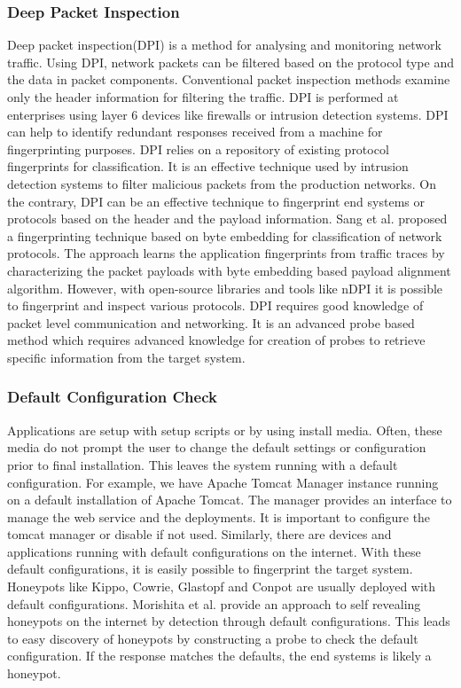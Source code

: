 \documentclass[letterpaper, 10 pt, conference]{ieeeconf}  %
\begin{document}
\subsubsection{Deep Packet Inspection}
Deep packet inspection(DPI) is a method for analysing and monitoring network traffic. Using DPI, network packets can be filtered based on the protocol type and the data in packet components. Conventional packet inspection methods examine only the header information for filtering the traffic. DPI is performed at enterprises using layer 6 devices like firewalls or intrusion detection systems. DPI can help to identify redundant responses received from a machine for fingerprinting purposes. DPI relies on a repository of existing protocol fingerprints for classification. It is an effective technique used by intrusion detection systems to filter malicious packets from the production networks. On the contrary, DPI can be an effective technique to fingerprint end systems or protocols based on the header and the payload information. Sang et al.\cite{Sang} proposed a fingerprinting technique based on byte embedding for classification of network protocols. The approach learns the application fingerprints from traffic traces by characterizing the packet payloads with byte embedding based payload alignment algorithm. However, with open-source libraries and tools like nDPI\cite{nDPI} it is possible to fingerprint and inspect various protocols. DPI requires good knowledge of packet level communication and networking. It is an advanced probe based method which requires advanced knowledge for creation of probes to retrieve specific information from the target system. 
\newline
\subsubsection{Default Configuration Check}
Applications are setup with setup scripts or by using install media. Often, these media do not prompt the user to change the default settings or configuration prior to final installation. This leaves the system running with a default configuration. For example, we have Apache Tomcat Manager instance running on a default installation of Apache Tomcat. The manager provides an interface to manage the web service and the deployments. It is important to configure the tomcat manager or disable if not used. Similarly, there are devices and applications running with default configurations on the internet. With these default configurations, it is easily possible to  fingerprint the target system. Honeypots like Kippo, Cowrie, Glastopf and Conpot are usually deployed with default configurations. Morishita et al. \cite{morishita} provide an approach to self revealing honeypots on the internet by detection through default configurations.  This leads to easy discovery of honeypots by constructing a probe to check the default configuration. If the response matches the defaults, the end systems is likely a honeypot. 
\newline
\end{document}
